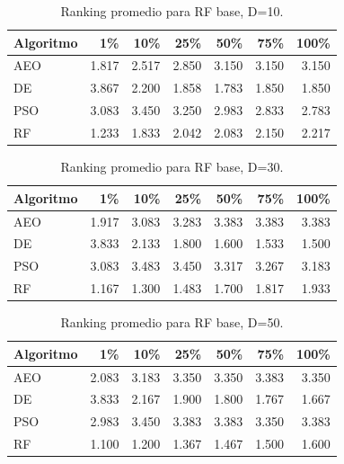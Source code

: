 \documentclass[11pt,a4paper]{article}
\begin{document}
\begin{table}[h!]
\centering \caption{Ranking promedio para RF base, D=10.} \label{tab:rf_d10}
\begin{tabular}{lrrrrrr} 
    \toprule Algoritmo & 1\% & 10\% & 25\% & 50\% & 75\% & 100\% \\ 
    \midrule AEO & 1.817 & 2.517 & 2.850 & 3.150 & 3.150 & 3.150 \\ 
    DE  & 3.867 & 2.200 & 1.858 & 1.783 & 1.850 & 1.850 \\ 
    PSO & 3.083 & 3.450 & 3.250 & 2.983 & 2.833 & 2.783 \\ 
    RF  & 1.233 & 1.833 & 2.042 & 2.083 & 2.150 & 2.217 \\ 
    \bottomrule \end{tabular} \end{table}
\begin{table}[h!]
\centering \caption{Ranking promedio para RF base, D=30.} \label{tab:rf_d30}
\begin{tabular}{lrrrrrr} 
    \toprule Algoritmo & 1\% & 10\% & 25\% & 50\% & 75\% & 100\% \\ 
    \midrule AEO & 1.917 & 3.083 & 3.283 & 3.383 & 3.383 & 3.383 \\ 
    DE  & 3.833 & 2.133 & 1.800 & 1.600 & 1.533 & 1.500 \\ 
    PSO & 3.083 & 3.483 & 3.450 & 3.317 & 3.267 & 3.183 \\ 
    RF  & 1.167 & 1.300 & 1.483 & 1.700 & 1.817 & 1.933 \\ 
    \bottomrule \end{tabular} \end{table}
\begin{table}[h!]
\centering \caption{Ranking promedio para RF base, D=50.} \label{tab:rf_d50}
\begin{tabular}{lrrrrrr} 
    \toprule Algoritmo & 1\% & 10\% & 25\% & 50\% & 75\% & 100\% \\ 
    \midrule AEO & 2.083 & 3.183 & 3.350 & 3.350 & 3.383 & 3.350 \\ 
    DE  & 3.833 & 2.167 & 1.900 & 1.800 & 1.767 & 1.667 \\ 
    PSO & 2.983 & 3.450 & 3.383 & 3.383 & 3.350 & 3.383 \\ 
    RF  & 1.100 & 1.200 & 1.367 & 1.467 & 1.500 & 1.600 \\ 
    \bottomrule \end{tabular} \end{table}
\end{document}

